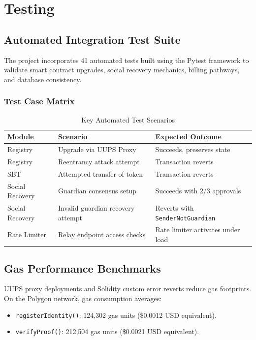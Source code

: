 \documentclass[12pt,a4paper,oneside]{report}
\begin{document}
\newpage

\chapter{Testing}

\section{Automated Integration Test Suite}
The project incorporates 41 automated tests built using the Pytest framework to validate smart contract upgrades, social recovery mechanics, billing pathways, and database consistency.

\subsection{Test Case Matrix}
\begin{table}[H]
    \centering
    \caption{Key Automated Test Scenarios}
    \label{tab:test_cases}
    \begin{tabular}{lll}
        \toprule
        \textbf{Module} & \textbf{Scenario} & \textbf{Expected Outcome} \\
        \midrule
        Registry & Upgrade via UUPS Proxy & Succeeds, preserves state \\
        Registry & Reentrancy attack attempt & Transaction reverts \\
        SBT & Attempted transfer of token & Transaction reverts \\
        Social Recovery & Guardian consensus setup & Succeeds with 2/3 approvals \\
        Social Recovery & Invalid guardian recovery attempt & Reverts with \texttt{SenderNotGuardian} \\
        Rate Limiter & Relay endpoint access checks & Rate limiter activates under load \\
        \bottomrule
    \end{tabular}
\end{table}

\section{Gas Performance Benchmarks}
UUPS proxy deployments and Solidity custom error reverts reduce gas footprints. On the Polygon network, gas consumption averages:
\begin{itemize}
    \item \texttt{registerIdentity()}: 124,302 gas units (\$0.0012 USD equivalent).
    \item \texttt{verifyProof()}: 212,504 gas units (\$0.0021 USD equivalent).
\end{itemize}
\end{document}
